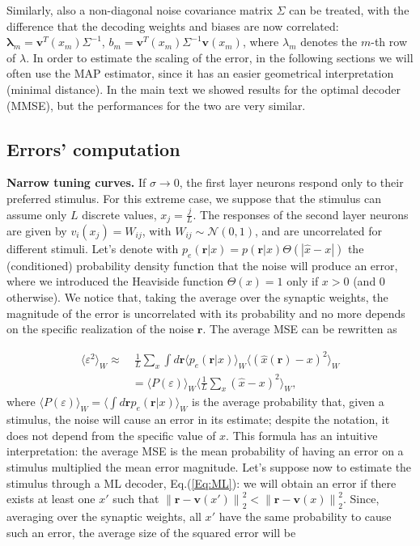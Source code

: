 \documentclass[a4paper]{article}
\begin{document}
Similarly, also a non-diagonal noise covariance matrix $\Sigma$ can be treated, with the difference  that the decoding weights and biases are now correlated: $\mathbf{\lambda}_m = \mathbf{v}^T(x_m)\Sigma^{-1}$, $b_m = \mathbf{v}^T(x_m)\Sigma^{-1}\mathbf{v}(x_m)$, where $\lambda_m$  denotes the $m$-th row of $\lambda$.
In order to estimate the scaling of the error, in the following sections we will often use the MAP estimator, since it has an easier geometrical interpretation (minimal distance). In the main text we showed results for the optimal decoder (MMSE), but the performances for the two are very similar.
\newline
\newline
\subsection{Errors' computation}
\textbf{Narrow tuning curves.} If $\sigma \rightarrow 0$, the first layer neurons respond only to their preferred stimulus. For this extreme case, we suppose that the stimulus can assume only $L$ discrete values, $x_j = \frac{j}{L}$.
The responses of the second layer neurons are given by $v_i(x_j) = W_{ij}$, with $W_{ij} \sim \mathcal{N}(0,1) $, and are uncorrelated for different stimuli. Let's denote with $p_e(\mathbf{r}|x) = p(\mathbf{r}|x)\Theta(|\hat{x}-x|)$ the (conditioned) probability density function that the noise will produce an error, where we introduced the Heaviside function $\Theta(x) = 1$ only if $x>0$ (and 0 otherwise).  We notice that, taking the average over the synaptic weights, the magnitude of the error is uncorrelated with its probability and no more depends on the specific realization of the noise $\mathbf{r}$. The average MSE can be rewritten as

\begin{equation}
\begin{split}
\langle \varepsilon^2  \rangle_W \approx &\ \frac{1}{L}\sum_x \int d\mathbf{r} \langle p_e(\mathbf{r}|x)\rangle_W \langle (\hat{x}(\mathbf{r}) -x )^2\rangle_W\\
&=\langle P(\varepsilon)\rangle_W \langle \frac{1}{L}\sum_x (\hat{x}-x)^2\rangle_W,
\label{Eq:PE}
\end{split}
\end{equation}where $\langle P(\varepsilon)\rangle_W = \langle \int d\mathbf{r} p_e(\mathbf{r}|x)\rangle_W$  is the average probability that, given a stimulus, the noise will cause an error in its estimate; despite the notation, it does not depend from the specific value of $x$.  This formula has an intuitive interpretation: the average MSE is the mean probability of having an error on a stimulus multiplied the mean error magnitude. Let's suppose now to estimate the stimulus through a ML decoder, Eq.(\ref{Eq:ML}): we will obtain an error if there exists at least one $x'$ such that $\left\lVert\mathbf{r}-\mathbf{v}(x') \right\rVert_2^2 < \left\lVert \mathbf{r}-\mathbf{v}(x)\right\rVert_2^2$.  Since, averaging over the synaptic weights, all $x'$ have the same probability to cause such an error, the average size of the squared error will be
\end{document}
